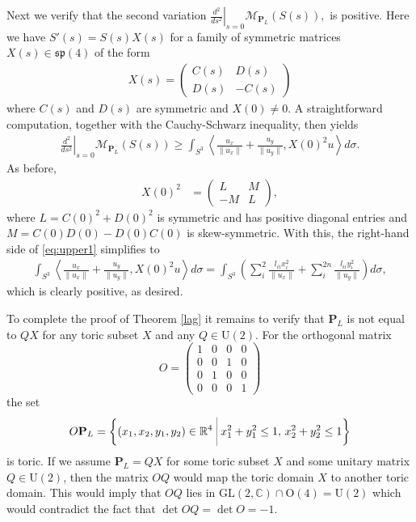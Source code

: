 \documentclass[12pt]{amsart}
\theoremstyle{definition}
\def\bigmid{\ \rule[-3.5mm]{0.1mm}{9mm}\ }
\newcommand{\CC}{{\mathbb C}}
\begin{document}
Next we verify that the second variation $\left.\frac{d^2}{ds^2}\right|_{s=0} \mathcal{M}_{\mathbf{P}_L} (S(s)),$ is positive.
Here we have  $S'(s)=S(s)X(s)$ for a family of symmetric matrices $X(s) \in \mathfrak{sp}(4)$ of the form 
\begin{align*}
    X(s) = \begin{pmatrix}
    C(s) & D(s)\\
    D(s) & -C(s)
    \end{pmatrix}
\end{align*}
where $C(s)$ and $D(s)$ are symmetric and $X(0) \neq 0$. A straightforward computation, together with the Cauchy-Schwarz inequality, then yields 
\begin{align}\label{eq:upper1}
  \left.\frac{d^2}{ds^2}\right|_{s=0} \mathcal{M}_{\mathbf{P}_L} (S(s))  \geq \int_{S^{3}}
\left\langle \frac{u_x}{\|u_x\|}+\frac{u_y}{\|u_y\|}, X(0)^2u \right\rangle d\sigma.
\end{align}
As before, 
\begin{align*}
    X(0)^2 &=  \begin{pmatrix}
    L & M\\
    -M & L
    \end{pmatrix},
    \end{align*}
where $L = C(0)^2 + D(0)^2$ is symmetric and has positive diagonal entries and $M=C(0)D(0)-D(0)C(0)$ is skew-symmetric. With this, the right-hand side of \eqref{eq:upper1} simplifies to
\begin{align*}
\int_{S^{3}}
\left\langle \frac{u_x}{\|u_x\|}+\frac{u_y}{\|u_y\|}, X(0)^2u \right\rangle d\sigma  = \int_{S^{3}} \left( \sum_i^{2}\frac{ l_{ii}x_i^2}{\|u_x\|}+\sum_i^{2n}\frac{ l_{ii}y_i^2}{\|u_y\|}\right) d\sigma,
\end{align*}
which is clearly positive, as desired.


To complete the proof of Theorem \ref{lag} it remains to verify that $\mathbf{P}_L$ is not equal to  $QX$ for any toric subset $X$ and any $Q \in \mathrm{U}(2)$.
For the orthogonal matrix\begin{equation*}
O = 
\begin{pmatrix}
1 & 0 & 0 &0 \\
0 & 0 & 1 &0 \\
0 & 1 & 0 &0 \\
0 & 0 & 0 &1 
\end{pmatrix}
\end{equation*} 
the set
$$O\mathbf{P}_L = \left\{ (x_1, x_{2}, y_1, y_{2}) \in \mathbb{R}^{4} \bigmid  x_1^2 + y_1^2 \leq 1,\, x_2^2 + y_2^2  \leq 1\right\}$$ is toric.
If we assume $\mathbf{P}_L=QX$ for some toric subset $X$ and some unitary matrix $Q \in \mathrm{U}(2)$, then the matrix $OQ$ would map the toric domain $X$ to another toric domain. This would imply that $OQ$ lies in $\mathrm{GL}(2,\CC) \cap \mathrm{O}(4) = \mathrm{U}(2)$ which would contradict the fact that $\det OQ =\det O =-1$.
\end{document}
